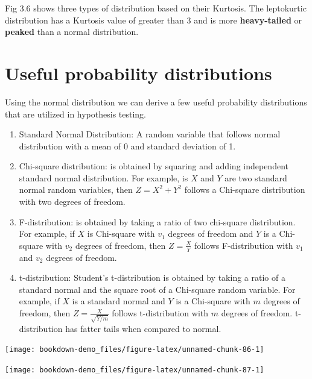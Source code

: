 \documentclass[
]{book}
\theoremstyle{definition}
\theoremstyle{definition}
\theoremstyle{definition}
\theoremstyle{definition}
\theoremstyle{remark}
\begin{document}
Fig 3.6 shows three types of distribution based on their Kurtosis. The leptokurtic distribution has a Kurtosis value of greater than 3 and is more \textbf{heavy-tailed} or \textbf{peaked} than a normal distribution.

\hypertarget{useful-probability-distributions}{%
\section{Useful probability distributions}\label{useful-probability-distributions}}

Using the normal distribution we can derive a few useful probability distributions that are utilized in hypothesis testing.

\begin{enumerate}
\def\labelenumi{\arabic{enumi}.}
\item
  Standard Normal Distribution: A random variable that follows normal distribution with a mean of 0 and standard deviation of 1.
\item
  Chi-square distribution: is obtained by squaring and adding independent standard normal distribution. For example, is \(X\) and \(Y\) are two standard normal random variables, then \(Z=X^2 + Y^2\) follows a Chi-square distribution with two degrees of freedom.
\item
  F-distribution: is obtained by taking a ratio of two chi-square distribution. For example, if \(X\) is Chi-square with \(v_1\) degrees of freedom and \(Y\) is a Chi-square with \(v_2\) degrees of freedom, then \(\displaystyle{Z=\frac{X}{Y}}\) follows F-distribution with \(v_1\) and \(v_2\) degrees of freedom.
\item
  t-distribution: Student's t-distribution is obtained by taking a ratio of a standard normal and the square root of a Chi-square random variable. For example, if \(X\) is a standard normal and \(Y\) is a Chi-square with \(m\) degrees of freedom, then \(Z=\displaystyle\frac{X}{\sqrt{Y/m}}\) follows t-distribution with \(m\) degrees of freedom. t-distribution has fatter tails when compared to normal.
\end{enumerate}

\begin{center}\texttt{[image: bookdown-demo\_files/figure-latex/unnamed-chunk-86-1]} \end{center}

\begin{center}\texttt{[image: bookdown-demo\_files/figure-latex/unnamed-chunk-87-1]} \end{center}
\end{document}
